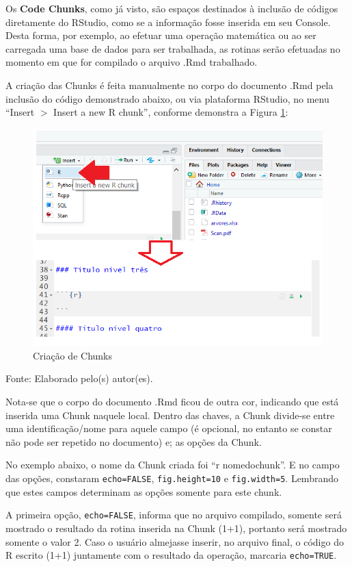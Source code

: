 \documentclass[12pt,brazil,oneside]{book}
\begin{document}
Os \textbf{Code Chunks}, como já visto, são espaços destinados à inclusão de códigos diretamente do RStudio, como se a informação fosse inserida em seu Console. Desta forma, por exemplo, ao efetuar uma operação matemática ou ao ser carregada uma base de dados para ser trabalhada, as rotinas serão efetuadas no momento em que for compilado o arquivo .Rmd trabalhado.

A criação das Chunks é feita manualmente no corpo do documento .Rmd pela inclusão do código demonstrado abaixo, ou via plataforma RStudio, no menu ``Insert \(>\) Insert a new R chunk'', conforme demonstra a Figura \ref{fig:rmarkchunk1}:

\begin{figure}[H]

{\centering \includegraphics[width=0.7\linewidth]{rmarkchunk1} 

}

\caption{Criação de Chunks}\label{fig:rmarkchunk1}
\end{figure}

Fonte: Elaborado pelo(s) autor(es).

Nota-se que o corpo do documento .Rmd ficou de outra cor, indicando que está inserida uma Chunk naquele local. Dentro das chaves, a Chunk divide-se entre uma identificação/nome para aquele campo (é opcional, no entanto se constar não pode ser repetido no documento) e; as opções da Chunk.

No exemplo abaixo, o nome da Chunk criada foi ``r nomedochunk''. E no campo das opções, constaram \texttt{echo=FALSE}, \texttt{fig.height=10} e \texttt{fig.width=5}. Lembrando que estes campos determinam as opções somente para este chunk.

A primeira opção, \texttt{echo=FALSE}, informa que no arquivo compilado, somente será mostrado o resultado da rotina inserida na Chunk (1+1), portanto será mostrado somente o valor 2. Caso o usuário almejasse inserir, no arquivo final, o código do R escrito (1+1) juntamente com o resultado da operação, marcaria \texttt{echo=TRUE}.
\end{document}
